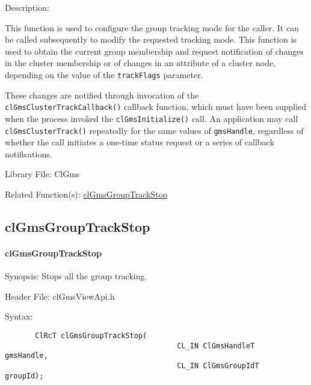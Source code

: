 \begin{flushleft}
\begin{Desc}
\item[Description:]

  This function is used to configure the group tracking mode for the caller. It can be called subsequently to modify the requested tracking mode.
  This function is used to obtain the current group membership and request notification of changes in the cluster membership or of changes in an
  attribute of a cluster node, depending on the value of the {\tt{track\-Flags}} parameter. \par
   \par
   These changes are notified through invocation of the {\tt{cl\-Gms\-Cluster\-Track\-Callback()}} callback function, which must have been supplied when the
   process invoked the {\tt{clGmsInitialize()}} call. An application may call {\tt{clGmsClusterTrack()}} repeatedly
   for the same values of {\tt{gms\-Handle}}, regardless of whether the call initiates a one-time status request or a series of callback notifications.
\end{Desc}
 \begin{Desc}
\item[Library File:]Cl\-Gms\end{Desc}
\begin{Desc}
  \item[Related Function(s):] \hyperlink{pagegms108}{clGmsGroupTrackStop}
  \end{Desc}

\newpage
\subsection{clGmsGroupTrackStop}
\hypertarget{pagegms108}{}\paragraph{cl\-Gms\-Group\-Track\-Stop}\label{pagegms108}

\begin{Desc}

\item[Synopsis:]
  Stops all the group tracking.\end{Desc}

\begin{Desc}
  \item[Header File:]
  clGmsViewApi.h\end{Desc}

 \begin{Desc}
  \item[Syntax:]
  \footnotesize\begin{verbatim}       ClRcT clGmsGroupTrackStop(
                                		CL_IN ClGmsHandleT              gmsHandle,
                                		CL_IN ClGmsGroupIdT             groupId);
  \end{verbatim}
  \normalsize
  \end{Desc}


\end{flushleft}
